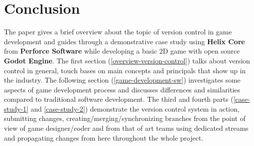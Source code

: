 \section{Conclusion}
The paper gives a brief overview about the topic of version control in game development and guides through a demonstrative 
case study using \textbf{Helix Core}\textsuperscript{\texttrademark} from \textbf{Perforce Software} while developing
a basic 2D game with open source \textbf{Godot Engine}. \hfill \break
The first section (\ref{overview-version-control}) talks about version control in general, touch bases on main concepts
and principals that show up in the industry. The following section (\ref{game-development-sw}) investigates some aspects 
of game development process and discusses differences and similarities compared to traditional software development. 
The third and fourth parts (\ref{case-study-1} and \ref{case-study-2}) demonstrate the version control system in action, 
submitting changes, creating/merging/synchronizing branches from the point of view of game designer/coder and from that 
of art teams using dedicated streams and propagating changes from here throughout the whole project.
